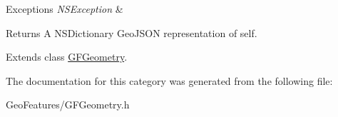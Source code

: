\begin{DoxyExceptions}{Exceptions}
{\em N\+S\+Exception} & \\
\hline
\end{DoxyExceptions}
\begin{DoxyReturn}{Returns}
A N\+S\+Dictionary Geo\+J\+S\+O\+N representation of self. 
\end{DoxyReturn}


Extends class \hyperlink{interface_g_f_geometry_a89a1dd53c1d9a51fd5b933fde28be5b7}{G\+F\+Geometry}.



The documentation for this category was generated from the following file\+:\begin{DoxyCompactItemize}
\item 
Geo\+Features/G\+F\+Geometry.\+h\end{DoxyCompactItemize}
